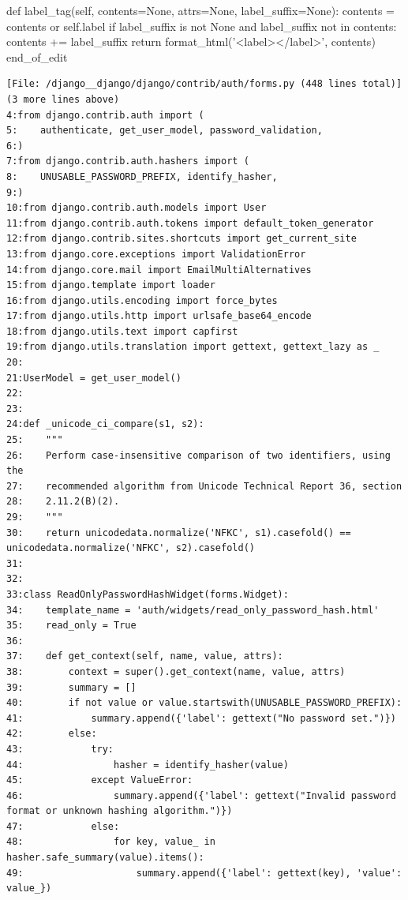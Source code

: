{\begin{agentbox}
\begin{CodeVerbatim}[breaklines=true, breakanywhere=true]
    def label_tag(self, contents=None, attrs=None, label_suffix=None):
        contents = contents or self.label
        if label_suffix is not None and label_suffix not in contents:
            contents += label_suffix
        return format_html('<label>{}</label>', contents)
end_of_edit
\end{CodeVerbatim}
\end{agentbox}
\begin{observationbox}\begin{Verbatim}[breaklines=true, breakanywhere=true]
[File: /django__django/django/contrib/auth/forms.py (448 lines total)]
(3 more lines above)
4:from django.contrib.auth import (
5:    authenticate, get_user_model, password_validation,
6:)
7:from django.contrib.auth.hashers import (
8:    UNUSABLE_PASSWORD_PREFIX, identify_hasher,
9:)
10:from django.contrib.auth.models import User
11:from django.contrib.auth.tokens import default_token_generator
12:from django.contrib.sites.shortcuts import get_current_site
13:from django.core.exceptions import ValidationError
14:from django.core.mail import EmailMultiAlternatives
15:from django.template import loader
16:from django.utils.encoding import force_bytes
17:from django.utils.http import urlsafe_base64_encode
18:from django.utils.text import capfirst
19:from django.utils.translation import gettext, gettext_lazy as _
20:
21:UserModel = get_user_model()
22:
23:
24:def _unicode_ci_compare(s1, s2):
25:    """
26:    Perform case-insensitive comparison of two identifiers, using the
27:    recommended algorithm from Unicode Technical Report 36, section
28:    2.11.2(B)(2).
29:    """
30:    return unicodedata.normalize('NFKC', s1).casefold() == unicodedata.normalize('NFKC', s2).casefold()
31:
32:
33:class ReadOnlyPasswordHashWidget(forms.Widget):
34:    template_name = 'auth/widgets/read_only_password_hash.html'
35:    read_only = True
36:
37:    def get_context(self, name, value, attrs):
38:        context = super().get_context(name, value, attrs)
39:        summary = []
40:        if not value or value.startswith(UNUSABLE_PASSWORD_PREFIX):
41:            summary.append({'label': gettext("No password set.")})
42:        else:
43:            try:
44:                hasher = identify_hasher(value)
45:            except ValueError:
46:                summary.append({'label': gettext("Invalid password format or unknown hashing algorithm.")})
47:            else:
48:                for key, value_ in hasher.safe_summary(value).items():
49:                    summary.append({'label': gettext(key), 'value': value_})

\end{Verbatim}
\end{observationbox}}
